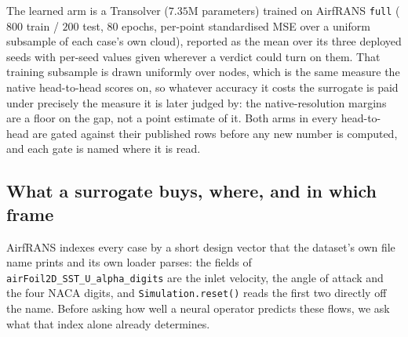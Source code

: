 The learned arm is a Transolver ($7.35$M parameters) trained on AirfRANS \texttt{full}
($800$ train / $200$ test, $80$ epochs, per-point standardised MSE over a uniform
subsample of each case's own cloud), reported as the mean over its three deployed seeds
with per-seed values given wherever a verdict could turn on them. That training subsample is
drawn uniformly over nodes, which is the same measure the native head-to-head scores on, so
whatever accuracy it costs the surrogate is paid under precisely the measure it is later
judged by: the native-resolution margins are a floor on the gap, not a point estimate of
it. Both arms in every
head-to-head are gated against their published rows before any new number is computed, and
each gate is named where it is read.

\subsection{What a surrogate buys, where, and in which frame}
\label{sec:interp}

AirfRANS indexes every case by a short design vector that the dataset's own file name
prints and its own loader parses: the fields of
\texttt{airFoil2D\_SST\_U\_alpha\_digits} are the inlet velocity, the angle of attack
and the four NACA digits, and \texttt{Simulation.reset()} reads the first two directly
off the name. Before asking how well a neural operator predicts these flows, we ask what
that index alone already determines.

